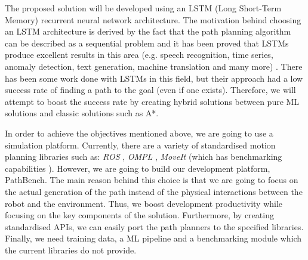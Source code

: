 The proposed solution will be developed using an LSTM \cite{hochreiter1997long} (Long Short-Term Memory) recurrent neural network architecture. The motivation behind choosing an LSTM architecture is derived by the fact that the path planning algorithm can be described as a sequential problem and it has been proved that LSTMs produce excellent results in this area (e.g. speech recognition, time series, anomaly detection, text generation, machine translation and many more) \cite{Goodfellow-et-al-2016}. There has been some work done with LSTMs \cite{nicola2018lstm, lee2018lstm, inoue2019robot} in this field, but their approach had a low success rate of finding a path to the goal (even if one exists). Therefore, we will attempt to boost the success rate by creating hybrid solutions between pure ML solutions and classic solutions such as A*.

In order to achieve the objectives mentioned above, we are going to use a simulation platform. Currently, there are a variety of standardised motion planning libraries such as: \textit{ROS} \cite{Quigley09}, \textit{OMPL} \cite{sucan2012the_open_motion_planning_library}, \textit{MoveIt} \cite{moveit} (which has benchmarking capabilities \cite{moll2015benchmarking}). However, we are going to build our development platform, PathBench. The main reason behind this choice is that we are going to focus on the actual generation of the path instead of the physical interactions between the robot and the environment. Thus, we boost development productivity while focusing on the key components of the solution. Furthermore, by creating standardised APIs, we can easily port the path planners to the specified libraries. Finally, we need training data, a ML pipeline and a benchmarking module which the current libraries do not provide.

